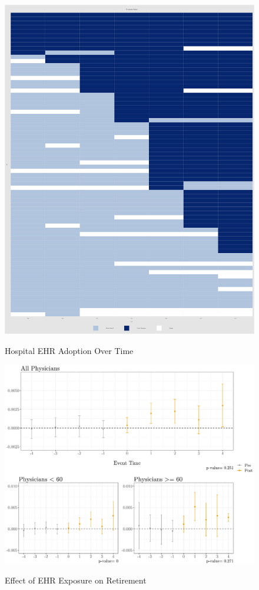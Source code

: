 \documentclass[11pt]{article}
\begin{document}
\begin{figure}
    \centering
    \caption{Hospital EHR Adoption Over Time}
    \includegraphics[scale=.6]{Objects/hosp_treat.png}
    \label{fig:hosp_treat}
\end{figure}

\begin{figure}[p]
    \centering
    \caption{Effect of EHR Exposure on Retirement}
    \includegraphics[scale=.4]{Objects/retire_plot.pdf}
    \label{fig:retirefirst}
\end{figure}
\end{document}
